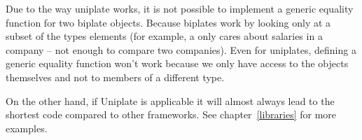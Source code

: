 Due to the way uniplate works, it is not possible to implement a generic
equality function for two biplate objects. Because biplates work by looking only
at a subset of the types elements (for example, a 
only cares about salaries in a company -- not enough to compare two companies). Even
for uniplates, defining a generic equality function won't work because we
only have access to the objects themselves and not to members of a different
type.

On the other hand, if Uniplate is applicable it will almost always lead to
the shortest code compared to other frameworks. See chapter~\ref{libraries}
for more examples.
